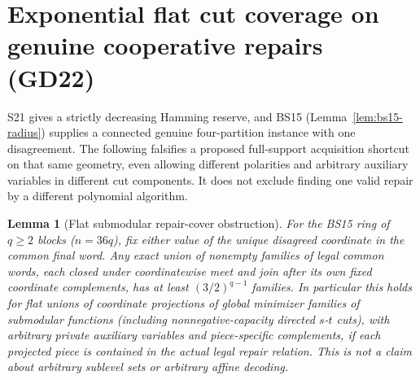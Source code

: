 \documentclass[11pt]{article}
\newtheorem{lemma}[theorem]{Lemma}
\begin{document}
\section{Exponential flat cut coverage on genuine cooperative repairs (GD22)}\label{sec:gd22}
S21 gives a strictly decreasing Hamming reserve, and BS15 (Lemma~\ref{lem:bs15-radius}) supplies a connected genuine four-partition instance with one disagreement. The following falsifies a proposed full-support acquisition shortcut on that same geometry, even allowing different polarities and arbitrary auxiliary variables in different cut components. It does not exclude finding one valid repair by a different polynomial algorithm.

\begin{lemma}[Flat submodular repair-cover obstruction]\label{lem:gd22-cover}
For the BS15 ring of $q\ge2$ blocks ($n=36q$), fix either value of the unique disagreed coordinate in the common final word. Any exact union of nonempty families of legal common words, each closed under coordinatewise meet and join after its own fixed coordinate complements, has at least $(3/2)^{q-1}$ families. In particular this holds for flat unions of coordinate projections of global minimizer families of submodular functions (including nonnegative-capacity directed $s$-$t$ cuts), with arbitrary private auxiliary variables and piece-specific complements, if each projected piece is contained in the actual legal repair relation. This is not a claim about arbitrary sublevel sets or arbitrary affine decoding.
\end{lemma}
\end{document}
